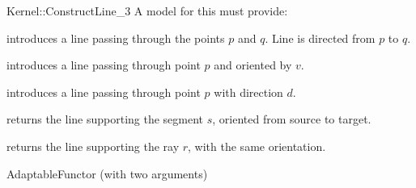 \begin{ccRefFunctionObjectConcept}{Kernel::ConstructLine_3}
A model for this must provide:


            {introduces a line  passing through the points $p$ and $q$. 
             Line  is directed from $p$ to $q$.}

            {introduces a line  passing through point $p$ and
             oriented by $v$.}

            {introduces a line  passing through point $p$ with 
             direction $d$.}

            {returns the line supporting the segment $s$,
            oriented from source to target.}

            {returns the line supporting the ray $r$, with the
            same orientation.}

\ccRefines
AdaptableFunctor (with two arguments)

\ccSeeAlso
{}  \\

\end{ccRefFunctionObjectConcept}
